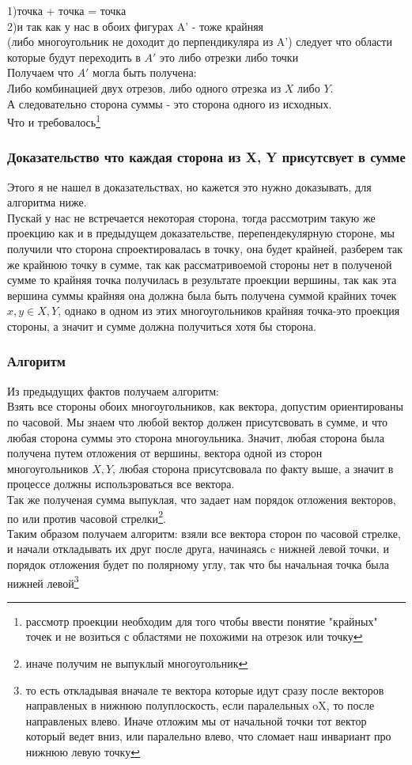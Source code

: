 \documentclass{article}
\begin{document}
1)точка + точка = точка\\
2)и так как у нас в обоих фигурах A' - тоже крайняя\\
(либо многоугольник не доходит до перпендикуляра из A') следует что области которые будут переходить в $A'$ это либо отрезки либо точки\\
Получаем что $A'$ могла быть получена:\\
Либо комбинацией двух отрезов, либо одного отрезка из $X$ либо $Y$.\\
А следовательно сторона суммы - это сторона одного из исходных.\\
Что и требовалось\footnote{рассмотр проекции необходим для того чтобы ввести понятие "крайных" точек и не возиться с областями не похожими на отрезок или точку}
\subsubsection*{Доказательство что каждая сторона из X, Y присутсвует в сумме}
Этого я не нашел в доказательствах, но кажется это нужно доказывать, для алгоритма ниже.\\
Пускай у нас не встречается некоторая сторона, тогда рассмотрим такую же проекцию как и в предыдущем доказательстве, перепендекулярную стороне, мы получили что сторона спроектировалась в точку, она будет крайней, разберем так же крайнюю точку в сумме, так как рассматривоемой стороны нет в полученой сумме то крайняя точка получилась в результате проекции вершины, так как эта вершина суммы крайняя она должна была быть получена суммой крайних точек $x, y \in X, Y$, однако в одном из этих многоугольников крайняя точка-это проекция стороны, а значит и сумме должна получиться хотя бы сторона.
\subsubsection*{Алгоритм}
Из предыдущих фактов получаем алгоритм:\\
Взять все стороны обоих многоугольников, как вектора, допустим ориентированы по часовой. Мы знаем что любой вектор должен присутсвовать в сумме, и что любая сторона суммы это сторона многоульника. Значит, любая сторона была получена путем отложения от вершины, вектора одной из сторон многоугольников $X,Y$, любая сторона присутсвовала по факту выше, а значит в процессе должны использроваться все вектора.\\
Так же полученая сумма выпуклая, что задает нам порядок отложения векторов, по или против часовой стрелки\footnote{иначе получим не выпуклый многоугольник}.\\
Таким образом получаем алгоритм: взяли все вектора сторон по часовой стрелке, и начали откладывать их друг после друга, начинаясь c нижней левой точки, и порядок отложения будет по полярному углу, так что бы начальная точка была нижней левой\footnote{то есть откладывая вначале те вектора которые идут сразу после векторов направленых в нижнюю полуплоскость, если паралельных oX, то после направленых влево. Иначе отложим мы от начальной точки тот вектор который ведет вниз, или паралельно влево, что сломает наш инвариант про нижнюю левую точку}
\end{document}
